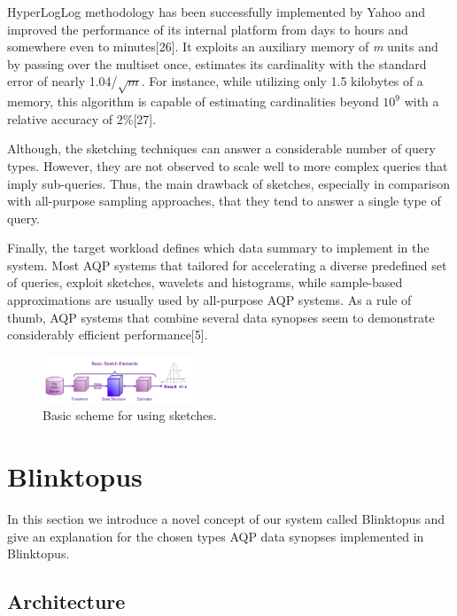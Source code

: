 \documentclass[10pt, conference, compsocconf]{IEEEtran}
\begin{document}
HyperLogLog methodology has been successfully implemented by Yahoo and improved the performance of its internal platform from days to hours and somewhere even to minutes[26]. It exploits an auxiliary memory of \textit{m} units and by passing over the multiset once, estimates its cardinality with the standard error of nearly 1.04/$\sqrt{\textit{m}}$. For instance, while utilizing only 1.5 kilobytes of a memory, this algorithm is capable of estimating cardinalities beyond $10^9$ with a relative accuracy of 2\%[27].

Although, the sketching techniques can answer a considerable number of query types. However, they are not observed to scale well to more complex queries that imply sub-queries. Thus, the main drawback of sketches, especially in comparison with all-purpose sampling approaches, that they tend to answer a single type of query. 

Finally, the target workload defines which data summary to implement in the system. Most AQP systems that tailored for accelerating a diverse predefined set of queries, exploit sketches, wavelets and histograms, while sample-based approximations are usually used by all-purpose AQP systems. As a rule of thumb, AQP systems that combine several data synopses seem to demonstrate considerably efficient performance[5]. 

\label{fig:sketches}

\begin{figure} \includegraphics[width=0.4\textwidth, center]{img/distinct_count_sketches.png} 
\caption[Basic scheme for using sketches.]%
{Basic scheme for using sketches.\footnotemark}
\end{figure}

\section{Blinktopus}
In this section we introduce a novel concept of our system called Blinktopus and give an explanation for the chosen types AQP data synopses implemented in Blinktopus.  

\subsection{Architecture}
\end{document}
